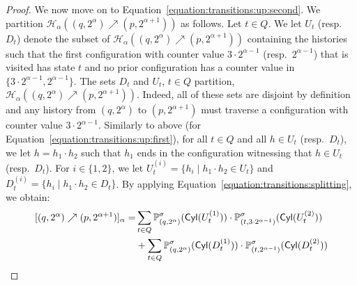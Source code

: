 \documentclass[a4paper,UKenglish,cleveref,autoref,thm-restate,colorlinks]{lipics-v2021}
\newcommand{\cyl}[1]{\mathsf{Cyl}(#1)}
\newcommand{\histPart}{\mathcal{H}}
\newcommand{\hist}{h}
\newcommand{\histConcat}[2]{#1\cdot{}#2}
\newcommand{\ocStateSpace}{Q}
\newcommand{\ocState}{q}
\newcommand{\ocStateB}{p}
\newcommand{\ocStateC}{t}
\newcommand{\powerIndex}{\alpha}
\newcommand{\upProba}[5]{[(#1,#2)\nearrow{}(#3,#4)]_{#5}}
\newcommand{\upHistSet}[5]{\histPart_{#5}((#1,#2)\nearrow{}(#3,#4))}
\newcommand{\upPart}[1]{U_{#1}}
\newcommand{\downPart}[1]{D_{#1}}
\newcommand{\stratGeneric}[1]{{\sigma_{#1}}}
\newcommand{\strat}{\stratGeneric{}}
\begin{document}
\begin{proof}
  We now move on to Equation~\eqref{equation:transitions:up:second}.
  We partition $\upHistSet{\ocState}{2^\powerIndex}{\ocStateB}{2^{\powerIndex+1}}{\powerIndex}$ as follows.
  Let $\ocStateC\in\ocStateSpace$.
  We let $\upPart{\ocStateC}$ (resp.~$\downPart{\ocStateC}$) denote the subset of $\upHistSet{\ocState}{2^\powerIndex}{\ocStateB}{2^{\powerIndex+1}}{\powerIndex}$ containing the histories such that the first configuration with counter value $3\cdot 2^{\powerIndex-1}$ (resp.~$2^{\powerIndex-1}$) that is visited has state $\ocStateC$ and no prior configuration has a counter value in $\{3\cdot 2^{\powerIndex-1},2^{\powerIndex-1}\}$.
  The sets $\downPart{\ocStateC}$ and $\upPart{\ocStateC}$, $\ocStateC\in\ocStateSpace$ partition, $\upHistSet{\ocState}{2^\powerIndex}{\ocStateB}{2^{\powerIndex+1}}{\powerIndex}$.
  Indeed, all of these sets are disjoint by definition and any history from $(\ocState, 2^\powerIndex)$ to $(\ocStateB, 2^{\powerIndex+1})$ must traverse a configuration with counter value $3\cdot 2^{\powerIndex-1}$.
  Similarly to above (for Equation~\eqref{equation:transitions:up:first}), for all $\ocStateC\in\ocStateSpace$ and all $\hist\in\upPart{\ocStateC}$ (resp.~$\downPart{\ocStateC}$), we let $\hist=\histConcat{\hist_1}{\hist_2}$ such that $\hist_1$ ends in the configuration witnessing that $\hist\in\upPart{\ocStateC}$ (resp.~$\downPart{\ocStateC}$).
  For $i\in\{1, 2\}$, we let $\upPart{\ocStateC}^{(i)}= \{\hist_i\mid\histConcat{\hist_1}{\hist_2}\in\upPart{\ocStateC}\}$ and $\downPart{\ocStateC}^{(i)}= \{\hist_i\mid\histConcat{\hist_1}{\hist_2}\in\downPart{\ocStateC}\}$.
  By applying Equation~\eqref{equation:transitions:splitting}, we obtain:
    \begin{equation*}
    \begin{aligned}
      \upProba{\ocState}{2^{\powerIndex}}{\ocStateB}{2^{\powerIndex+1}}{\powerIndex} =
      &
      \sum_{\ocStateC\in\ocStateSpace}
      \probaG{(\ocState, 2^\powerIndex)}{\strat}(\cyl{\upPart{\ocStateC}^{(1)}})
      \cdot
      \probaG{(\ocStateC, 3\cdot 2^{\powerIndex-1})}{\strat}(\cyl{\upPart{\ocStateC}^{(2)}})
      \\
      & +
      \sum_{\ocStateC\in\ocStateSpace}
      \probaG{(\ocState, 2^\powerIndex)}{\strat}(\cyl{\downPart{\ocStateC}^{(1)}})
      \cdot
      \probaG{(\ocStateC, 2^{\powerIndex-1})}{\strat}(\cyl{\downPart{\ocStateC}^{(2)}})
    \end{aligned}
  \end{equation*}


\end{proof}
\end{document}
